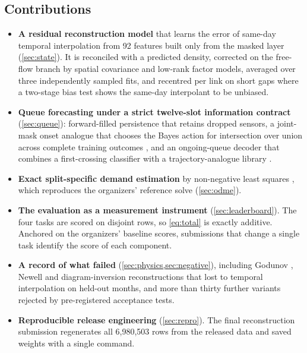 \subsection{Contributions}
\begin{itemize}
  \item \textbf{A residual reconstruction model} that learns the error of same-day temporal interpolation from 92
        features built only from the masked layer (\cref{sec:state}). It is reconciled with a predicted density,
        corrected on the free-flow branch by spatial covariance and low-rank factor models, averaged over three
        independently sampled fits, and recentred per link on short gaps where a two-stage bias test shows the
        same-day interpolant to be unbiased.
  \item \textbf{Queue forecasting under a strict twelve-slot information contract} (\cref{sec:queue}): forward-filled
        persistence that retains dropped sensors, a joint-mask onset analogue that chooses the Bayes action for
        intersection over union across complete training outcomes \cite{nowozin2014}, and an ongoing-queue decoder that
        combines a first-crossing classifier with a trajectory-analogue library \cite{lorenz1969}.
  \item \textbf{Exact split-specific demand estimation} by non-negative least squares \cite{lawson1974}, which
        reproduces the organizers' reference solve (\cref{sec:odme}).
  \item \textbf{The evaluation as a measurement instrument} (\cref{sec:leaderboard}). The four tasks are scored on
        disjoint rows, so \cref{eq:total} is exactly additive. Anchored on the organizers' baseline scores, submissions
        that change a single task identify the score of each component.
  \item \textbf{A record of what failed} (\cref{sec:physics,sec:negative}), including Godunov
        \cite{godunov1959,daganzo1994}, Newell \cite{newell1993} and diagram-inversion reconstructions that lost to
        temporal interpolation on held-out months, and more than thirty further variants rejected by pre-registered
        acceptance tests.
  \item \textbf{Reproducible release engineering} (\cref{sec:repro}). The final reconstruction submission regenerates
        all 6,980,503 rows from the released data and saved weights with a single command.
\end{itemize}

